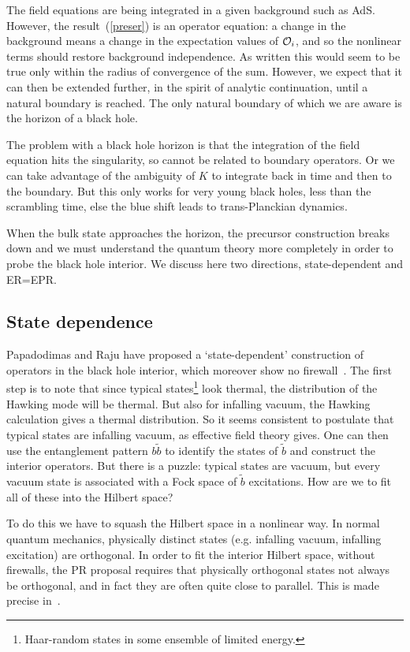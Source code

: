 \documentclass[12pt]{article}
\begin{document}
The field equations are being integrated in a given background such as AdS.  However, the result~(\ref{preser}) is an operator equation: a change in the background means a change in the expectation values of ${\cal O}_i$, and so the nonlinear terms should restore background independence.  As written this would seem to be true only within the radius of convergence of the sum.  However, we expect that it can then be extended further, in the spirit of analytic continuation, until a natural boundary is reached.  The only natural boundary of which we are aware is the horizon of a black hole.

The problem with a black hole horizon is that the integration of the field equation hits the singularity, so cannot be related to boundary operators.  Or we can take advantage of the ambiguity of $K$ to integrate back in time and then to the boundary.  But this only works for very young black holes, less than the scrambling time, else the blue shift leads to trans-Planckian dynamics.

When the bulk state approaches the horizon, the precursor construction breaks down and we must understand the quantum theory more completely in order to probe the black hole interior.  We discuss here two directions, state-dependent and ER=EPR.

\subsection{State dependence}

Papadodimas and Raju have proposed a `state-dependent' construction of operators in the black hole interior, which moreover show no firewall~\cite{Papadodimas:2012aq}.  The first step is to note that since typical states\footnote{Haar-random states in some ensemble of limited energy.} look thermal,   
the distribution of the Hawking mode will be thermal.  But also for infalling vacuum, the Hawking calculation gives a thermal distribution.  So it seems consistent to postulate that typical states are infalling vacuum, as effective field theory gives.  One can then use the entanglement pattern $b\tilde b$ to identify the states of $\tilde b$ and construct the interior operators.  But there is a puzzle: typical states are vacuum, but every vacuum state is associated with a Fock space of $\tilde b$ excitations.  How are we to fit all of these into the Hilbert space?

To do this we have to squash the Hilbert space in a nonlinear way.  In normal quantum mechanics, physically distinct states (e.g. infalling vacuum, infalling excitation) are orthogonal.  In order to fit the interior Hilbert space, without firewalls, the PR proposal requires that physically orthogonal states not always be orthogonal, and in fact they are often quite close to parallel.  This is made precise in~\cite{Marolf:2015dia}.
\end{document}
